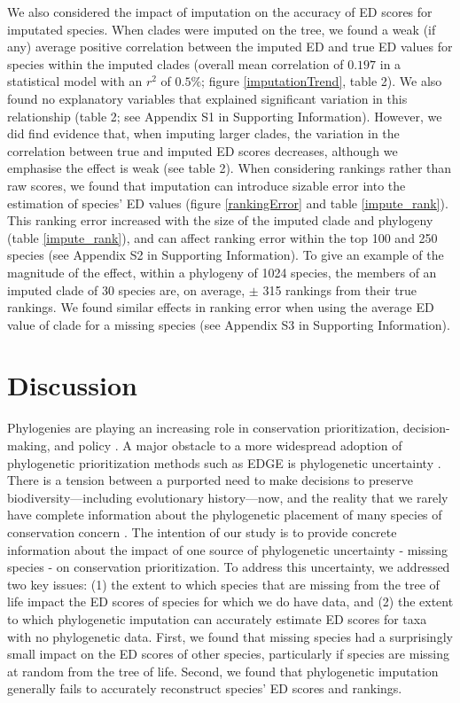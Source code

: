 \documentclass[10pt,english]{article}
\begin{document}
We also considered the impact of imputation on the accuracy of ED scores for
imputated species. When clades were imputed on the tree, we found a weak (if
any) average positive correlation between the imputed ED and true ED values for
species within the imputed clades (overall mean correlation of $0.197$ in a
statistical model with an $r^2$ of $0.5\%$; figure \ref{imputationTrend}, table
2). We also found no explanatory variables that explained significant variation
in this relationship (table 2; see Appendix S1 in Supporting Information).
However, we did find evidence that, when imputing larger clades, the variation
in the correlation between true and imputed ED scores decreases, although we
emphasise the effect is weak (see table 2). When considering rankings rather
than raw scores, we found that imputation can introduce sizable error into the
estimation of species' ED values (figure \ref{rankingError} and table
\ref{impute_rank}). This ranking error increased with the size of the imputed
clade and phylogeny (table \ref{impute_rank}), and can affect ranking error
within the top 100 and 250 species (see Appendix S2 in Supporting Information).
To give an example of the magnitude of the effect, within a phylogeny of 1024
species, the members of an imputed clade of 30 species are, on average, $\pm$
315 rankings from their true rankings. We found similar effects in ranking error
when using the average ED value of clade for a missing species (see Appendix S3
in Supporting Information). 

\section*{Discussion}
Phylogenies are playing an increasing role in conservation prioritization,
decision-making, and policy \autocite{Vezquez1998, Veron2017}. A major obstacle
to a more widespread adoption of phylogenetic prioritization methods such as
EDGE is phylogenetic uncertainty \autocite{Collen2015}. There is a tension
between a purported need to make decisions to preserve biodiversity---including
evolutionary history---now, and the reality that we rarely have complete
information about the phylogenetic placement of many species of conservation
concern \autocite{Isaac2018}. The intention of our study is to
provide concrete information about the impact of one source of phylogenetic
uncertainty - missing species - on conservation prioritization. To address this
uncertainty, we addressed two key issues: (1) the extent to which species that
are missing from the tree of life impact the ED scores of species for which we
do have data, and (2) the extent to which phylogenetic imputation can accurately
estimate ED scores for taxa with no phylogenetic data. First, we found that
missing species had a surprisingly small impact on the ED scores of other
species, particularly if species are missing at random from the tree of life.
Second, we found that phylogenetic imputation generally fails to accurately
reconstruct species' ED scores and rankings.
\end{document}
